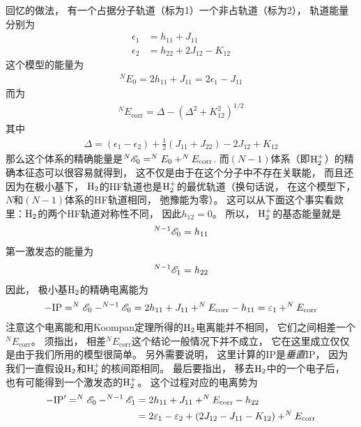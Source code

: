 回忆的做法，
有一个占据分子轨道（标为1）一个非占轨道（标为2），
轨道能量分别为
\begin{subequations}
	\begin{align}
	\epsilon_1 & = h_{11} + J_{11}\\
	\epsilon_2 & = h_{22} + 2J_{12} - K_{12}
	\end{align}
\end{subequations}
这个模型的能量为
\begin{align}
^NE_0 = 2h_{11} + J_{11} = 2\epsilon_1 - J_{11}
\end{align}
而为
\begin{align}\label{7.49}
^NE_\mathrm{corr} = \Delta - (\Delta^2 + K_{12}^2)^{1/2}
\end{align}
其中
\begin{align}\label{7.50}
\Delta = (\epsilon_1 - \epsilon_2) + \frac{1}{2}(J_{11} + J_{22}) - 2J_{12} + K_{12}
\end{align}
那么这个体系的精确能量是$^N\mathscr{E}_0 = ^NE_0 + ^NE_\mathrm{corr}$. 
而$(N-1)$体系（即$\mathrm{H}_2^+$）的精确本征态可以很容易就得到，
这不仅是由于在这个分子中不存在关联能，
而且还因为在极小基下，
$\mathrm{H}_2$的HF轨道也是$\mathrm{H}_2^+$的最优轨道（换句话说，
在这个模型下，
$N$和$(N-1)$体系的HF轨道相同，
弛豫能为零）。
这可以从下面这个事实看欻里：$\mathrm{H}_2$的两个HF轨道对称性不同，
因此$h_{12}=0$。
所以，
$\mathrm{H}_2^+$的基态能量就是
\begin{align}
^{N-1}\mathscr{E}_0 = h_{11}
\end{align}
第一激发态的能量为
\begin{align}
^{N-1}\mathscr{E}_1 = h_{22}
\end{align}
因此，
极小基$\mathrm{H}_2$的精确电离能为
\begin{align}\label{7.52a}
-\mathrm{IP} = ^{N}\mathscr{E}_0 - ^{N-1}\mathscr{E}_0 = 2h_{11} + J_{11} + ^NE_\mathrm{corr} - h_{11} = \varepsilon_1 + ^NE_\mathrm{corr}
\end{align}
注意这个电离能和用Koompan定理所得的$\mathrm{H}_2$电离能并不相同，
它们之间相差一个$^NE_\mathrm{corr}$。
须指出，
相差$^NE_\mathrm{corr}$这个结论一般情况下并不成立，
它在这里成立仅仅是由于我们所用的模型很简单。
另外需要说明，
这里计算的IP是\emph{垂直}IP，
因为我们一直假设$\mathrm{H}_2$和$\mathrm{H}_2^+$的核间距相同。
最后要指出，
移去$\mathrm{H}_2$中的一个电子后，
也有可能得到一个激发态的$\mathrm{H}_2^+$。
这个过程对应的电离势为
\begin{align}
-\mathrm{IP}' = ^{N}\mathscr{E}_0 - ^{N-1}\mathscr{E}_1 &=  2h_{11} + J_{11} + ^NE_\mathrm{corr} - h_{22} \notag \\
& = 2\varepsilon_1 -\varepsilon_2 + (2J_{12} - J_{11} - K_{12}) + ^NE_\mathrm{corr} 
\label{7.52b}
\end{align}

